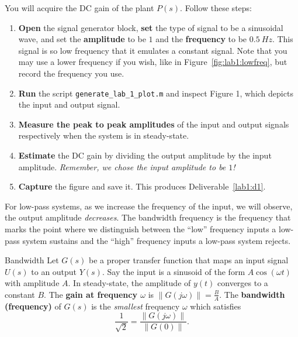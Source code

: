 \begin{procedure}[label={proc:lab1:p1}]
  You will acquire the DC gain of the plant \(P(s)\). Follow these steps:
  \begin{enumerate}[label=(\arabic*)]
    \item{
      \textbf{Open} the signal generator block, \textbf{set} the type of signal
      to be a sinusoidal wave, and set the
      \textbf{amplitude} to be \(1\) and the \textbf{frequency}
      to be \(\SI{0.5}{Hz}.\) This signal is so low frequency that it
      emulates a constant signal. Note that you may use a lower frequency if
      you wish, like in Figure~\ref{fig:lab1:lowfreq}, but record the frequency
      you use.
    }
    \item{
      \textbf{Run} the script \texttt{generate\_lab\_1\_plot.m} and inspect
      Figure 1, which depicts the input and output signal.
    }
    \item{
      \textbf{Measure the peak to peak amplitudes} of the input and output signals respectively when the system is in steady-state.
    }
    \item{
      \textbf{Estimate} the DC gain by dividing the output amplitude
      by the input amplitude. \emph{Remember, we chose the input amplitude
      to be \(1\)!}
    }
    \item{
      \textbf{Capture} the figure and save it.
      This produces Deliverable~\ref{lab1:d1}.
    }
  \end{enumerate}
\end{procedure}
%
For low-pass systems, as we increase the frequency of the input, we will
observe, the output amplitude \emph{decreases}. The bandwidth frequency
is the frequency that marks the point where we distinguish between the
``low'' frequency inputs a low-pass system sustains and the ``high'' frequency
inputs a low-pass system rejects.
%
\begin{definition}[label={def:bandwidth}]{Bandwidth}
  Let \(G(s)\) be a proper transfer function
  that maps an input signal \(U(s)\) to an output \(Y(s).\)
%
  Say the input is a sinusoid of the form \(A \cos(\omega t)\) with amplitude
  \(A.\) In steady-state, the amplitude of \(y(t)\) converges to a constant
  \(B.\) The \textbf{gain at frequency \(\omega\)} is
  \(\left\|G(j\omega)\right\| = \frac{B}{A}.\)
%
  The \textbf{bandwidth (frequency)} of \(G(s)\) is the \emph{smallest}
  frequency \(\omega\) which satisfies
  \[
    \frac{1}{\sqrt{2}} = \frac{\left\|G(j\omega)\right\|}{\left\|G(0)\right\|}.
  \]
\end{definition}
